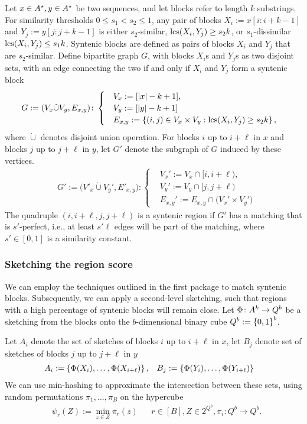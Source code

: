 Let $x\in A^\star, y\in A^\star$ be two sequences, and let blocks refer to length $k$ substrings. For similarity thresholds $0\le s_1 < s_2\le 1$, any pair of blocks $X_i:=x[i:i+k-1]$ and $Y_j:=y[j:j+k-1]$ is either $s_2$-similar, $\operatorname{\mathrm{lcs}}(X_i,Y_j)\ge s_2 k$, or $s_1$-dissimilar $\operatorname{\mathrm{lcs}}(X_i,Y_j)\le s_1 k$. Syntenic blocks are defined as pairs of blocks $X_i$ and $Y_j$ that are $s_2$-similar. Define bipartite graph $G$, with blocks $X_i$s and $Y_j$s as two disjoint sets, with an edge connecting the two if and only if $X_i$ and $Y_j$ form a syntenic block
\begin{align}
&G := (V_x\dot\cup V_y, E_{x,y}) \colon 
\begin{cases}
&V_x:=[|x|-k+1], \\
&V_y:=[|y|-k+1]\\
& E_{x,y}:= \left\{(i,j)\in V_x\times V_y: \operatorname{\mathrm{lcs}}(X_i, Y_j)\ge s_2 k\right\}, 
\end{cases} 
\end{align}
where $\dot\cup$ denotes disjoint union operation. For blocks $i$ up to $i+\ell$ in $x$ and blocks $j$ up to $j+\ell$ in $y$, let $G'$ denote the subgraph of $G$ induced by these vertices. 
\begin{align}
&G':=\Big(V'_x\dot\cup V_y', E'_{x,y}\Big) \colon \begin{cases}
 &V_x':=V_x\cap [i,i+\ell), \\
 &V_y':=V_y\cap [j,j+\ell) \\
 &E_{x,y}':= E_{x,y} \cap \big(V_x'\times V_y'\big)
 \end{cases}
\end{align}
 The quadruple $(i,i+\ell, j, j+\ell)$ is a syntenic region if $G'$ has a matching that is $s'$-perfect, i.e., at least  $s' \ell$ edges will be part of the matching, where $s'\in[0,1]$ is a similarity constant. 


\subsubsection*{Sketching the region score}
We can employ the techniques outlined in the first package to match syntenic blocks. Subsequently, we can apply a second-level sketching, such that regions with a high percentage of syntenic blocks will remain close. Let $\Phi\colon A^k\to Q^b$ be a sketching from the blocks onto the $b$-dimensional binary cube $Q^b:= \left\{0,1\right\}^b$. 

Let $A_i$ denote the set of sketches of blocks $i$ up to $i+\ell$ in $x$, let $B_j$ denote set of sketches of blocks $j$ up to $j+\ell$ in $y$
\begin{align}
    &A_i:= \left\{\Phi(X_i),\dots,\Phi(X_{i+\ell})\right\},
    &&B_j:= \left\{\Phi(Y_i),\dots,\Phi(Y_{i+\ell})\right\}
\end{align}
We can use min-hashing to approximate the intersection between these sets, using random permutations $\pi_1,\dots, \pi_B$ on the hypercube 
\begin{align}
    &\psi_r(Z):=\min_{z\in Z} \pi_r(z)  && r\in[B], Z\in 2^{Q^b}, \pi_i\colon Q^b\to Q^b.
\end{align}

